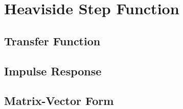 \section*{Heaviside Step Function}
\subsection*{Transfer Function}
\subsection*{Impulse Response}
\subsection*{Matrix-Vector Form}